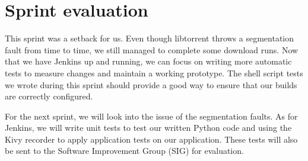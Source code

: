 	\section{Sprint evaluation}
		This sprint was a setback for us. Even though libtorrent throws a segmentation fault from time to time, we still managed to complete some download runs. Now that we have Jenkins up and running, we can focus on writing more automatic tests to measure changes and maintain a working prototype. The shell script tests we wrote during this sprint should provide a good way to ensure that our builds are correctly configured.
		
		For the next sprint, we will look into the issue of the segmentation faults. As for Jenkins, we will write unit tests to test our written Python code and using the Kivy recorder to apply application tests on our application. These tests will also be sent to the Software Improvement Group (SIG) for evaluation.

